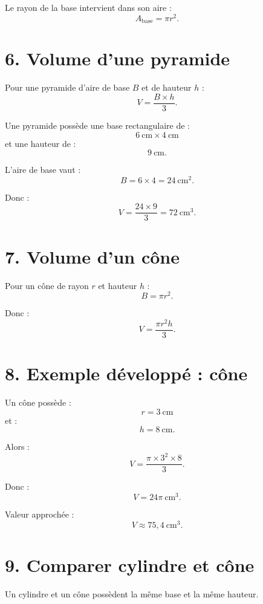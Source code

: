 Le rayon de la base intervient dans son aire :
\[
A_{\text{base}}=\pi r^2.
\]


\section{6. Volume d'une pyramide}

\begin{propriete}
Pour une pyramide d'aire de base $B$ et de hauteur $h$ :
\[
\boxed{V=\dfrac{B\times h}{3}}.
\]
\end{propriete}

\begin{exemple}
Une pyramide possède une base rectangulaire de :
\[
6\ \text{cm}\times4\ \text{cm}
\]
et une hauteur de :
\[
9\ \text{cm}.
\]

L'aire de base vaut :
\[
B=6\times4=24\ \text{cm}^2.
\]

Donc :
\[
V=\dfrac{24\times9}{3}=72\ \text{cm}^3.
\]
\end{exemple}

\section{7. Volume d'un cône}

Pour un cône de rayon $r$ et hauteur $h$ :
\[
B=\pi r^2.
\]

Donc :
\[
\boxed{
V=\dfrac{\pi r^2h}{3}
}.
\]

\section{8. Exemple développé : cône}

Un cône possède :
\[
r=3\ \text{cm}
\]
et :
\[
h=8\ \text{cm}.
\]

Alors :
\[
V=\dfrac{\pi\times3^2\times8}{3}.
\]

Donc :
\[
V=24\pi\ \text{cm}^3.
\]

Valeur approchée :
\[
V\approx75{,}4\ \text{cm}^3.
\]

\section{9. Comparer cylindre et cône}

Un cylindre et un cône possèdent la même base et la même hauteur.

